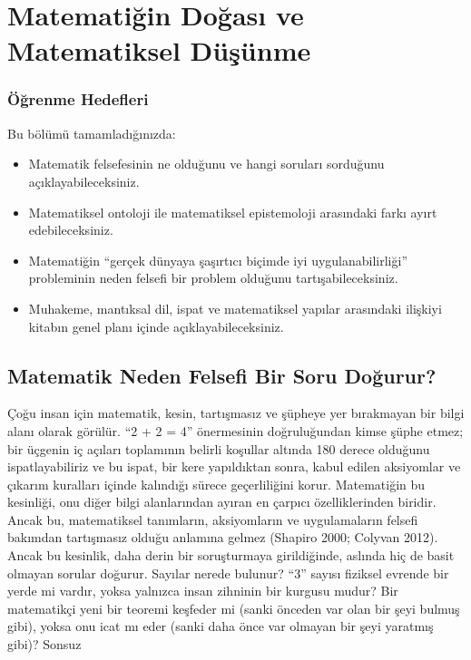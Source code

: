 \chapter{Matematiğin Doğası ve Matematiksel Düşünme}
\label{chap:matematigin-dogasi}


\subsection*{Öğrenme Hedefleri}

Bu bölümü tamamladığınızda:

\begin{itemize}\setlength{\itemsep}{2pt}\setlength{\parskip}{0pt}
\item Matematik felsefesinin ne olduğunu ve hangi soruları sorduğunu açıklayabileceksiniz.
\item Matematiksel ontoloji ile matematiksel epistemoloji arasındaki farkı ayırt edebileceksiniz.
\item Matematiğin “gerçek dünyaya şaşırtıcı biçimde iyi uygulanabilirliği” probleminin neden felsefi bir problem olduğunu tartışabileceksiniz.
\item Muhakeme, mantıksal dil, ispat ve matematiksel yapılar arasındaki ilişkiyi kitabın genel planı içinde açıklayabileceksiniz.
\end{itemize}

\section{Matematik Neden Felsefi Bir Soru Doğurur?}

Çoğu insan için matematik, kesin, tartışmasız ve şüpheye yer bırakmayan bir bilgi alanı olarak görülür. “2 + 2 = 4” önermesinin doğruluğundan kimse şüphe etmez; bir üçgenin iç açıları toplamının belirli koşullar altında 180 derece olduğunu ispatlayabiliriz ve bu ispat, bir kere yapıldıktan sonra, kabul edilen aksiyomlar ve çıkarım kuralları içinde kalındığı sürece geçerliliğini korur. Matematiğin bu kesinliği, onu diğer bilgi alanlarından ayıran en çarpıcı özelliklerinden biridir. Ancak bu, matematiksel tanımların, aksiyomların ve uygulamaların felsefi bakımdan tartışmasız olduğu anlamına gelmez (Shapiro 2000; Colyvan 2012). Ancak bu kesinlik, daha derin bir soruşturmaya girildiğinde, aslında hiç de basit olmayan sorular doğurur. Sayılar nerede bulunur? “3” sayısı fiziksel evrende bir yerde mi vardır, yoksa yalnızca insan zihninin bir kurgusu mudur? Bir matematikçi yeni bir teoremi keşfeder mi (sanki önceden var olan bir şeyi bulmuş gibi), yoksa onu icat mı eder (sanki daha önce var olmayan bir şeyi yaratmış gibi)? Sonsuz

